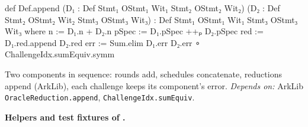 \begin{leancode}
def Def.append (D₁ : Def Stmt₁ OStmt₁ Wit₁ Stmt₂ OStmt₂ Wit₂)
    (D₂ : Def Stmt₂ OStmt₂ Wit₂ Stmt₃ OStmt₃ Wit₃) : Def Stmt₁ OStmt₁ Wit₁ Stmt₃ OStmt₃ Wit₃ where
  n := D₁.n + D₂.n
  pSpec := D₁.pSpec ++ₚ D₂.pSpec
  red := D₁.red.append D₂.red
  err := Sum.elim D₁.err D₂.err ∘ ChallengeIdx.sumEquiv.symm
\end{leancode}


Two components in sequence: rounds add, schedules concatenate, reductions append (ArkLib), each challenge keeps its component's error. \emph{Depends on:} ArkLib \texttt{OracleReduction.\allowbreak{}append}, \texttt{ChallengeIdx.\allowbreak{}sumEquiv}.

\par\medskip\noindent\textbf{Helpers and test fixtures of .}

